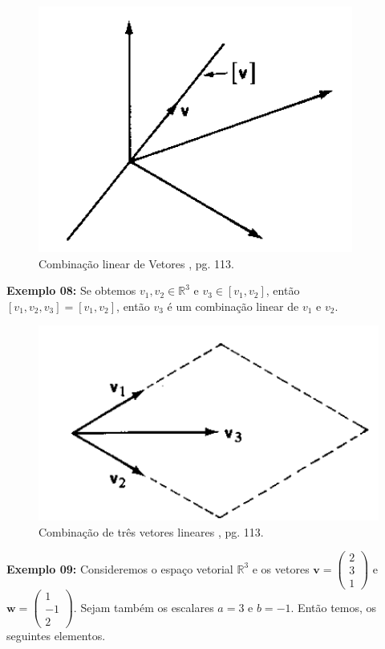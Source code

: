 \begin{figure}[H]
	\centering
	\includegraphics[scale=0.90]{cb_exemplo7.png}
	\caption{Combinação linear de Vetores \cite{boldrini1980}, pg. 113.}
\end{figure}

\noindent\textbf{Exemplo 08:} Se obtemos $v_1, v_2 \in \mathbb{R}^3$ e $v_3 \in [v_1, v_2]$, então $[v_1, v_2, v_3] = [v_1, v_2]$, então $v_3$ é um combinação linear de  $v_1$ e $v_2$.

\begin{figure}[H]
	\centering
	\includegraphics[scale=0.90]{cb_exemplo8.png}
	\caption{Combinação de três vetores lineares \cite{boldrini1980}, pg. 113.}
\end{figure}

\noindent\textbf{Exemplo 09:} Consideremos o espaço vetorial $\mathbb{R}^3$ e os vetores $\mathbf{v} = \begin{pmatrix} 2 \\ 3 \\ 1 \end{pmatrix}$ e $\mathbf{w} = \begin{pmatrix} 1 \\ -1 \\ 2 \end{pmatrix}$. Sejam também os escalares $a = 3$ e $b = -1$. Então temos, os seguintes elementos.

